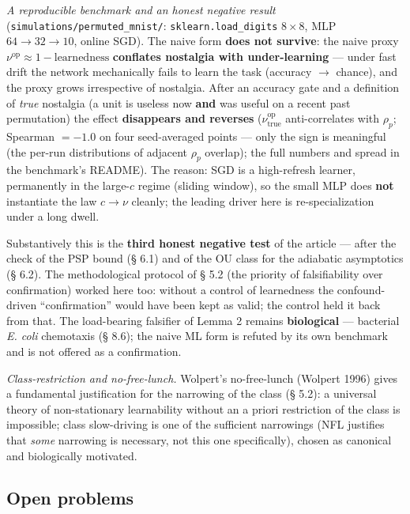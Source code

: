 \documentclass[pdflatex,sn-mathphys-ay]{sn-jnl}
\begin{document}
\emph{A reproducible benchmark and an honest negative result} (\texttt{simulations/permuted\_mnist/}: \texttt{sklearn.load\_digits} \(8\times8\), MLP \(64\to32\to10\), online SGD). The naive form \textbf{does not survive}: the naive proxy \(\nu^{\text{op}} \approx 1 - \text{learnedness}\) \textbf{conflates nostalgia with under-learning} --- under fast drift the network mechanically fails to learn the task (accuracy \(\to\) chance), and the proxy grows irrespective of nostalgia. After an accuracy gate and a definition of \emph{true} nostalgia (a unit is useless now \textbf{and} was useful on a recent past permutation) the effect \textbf{disappears and reverses} (\(\nu^{\text{op}}_{\text{true}}\) anti-correlates with \(\rho_p\); Spearman \(= -1.0\) on four seed-averaged points --- only the sign is meaningful (the per-run distributions of adjacent \(\rho_p\) overlap); the full numbers and spread in the benchmark's README). The reason: SGD is a high-refresh learner, permanently in the large-\(c\) regime (sliding window), so the small MLP does \textbf{not} instantiate the law \(c \to \nu\) cleanly; the leading driver here is re-specialization under a long dwell.



Substantively this is the \textbf{third honest negative test} of the article --- after the check of the PSP bound (§ 6.1) and of the OU class for the adiabatic asymptotics (§ 6.2). The methodological protocol of § 5.2 (the priority of falsifiability over confirmation) worked here too: without a control of learnedness the confound-driven ``confirmation'' would have been kept as valid; the control held it back from that. The load-bearing falsifier of Lemma 2 remains \textbf{biological} --- bacterial \emph{E. coli} chemotaxis (§ 8.6); the naive ML form is refuted by its own benchmark and is not offered as a confirmation.



\emph{Class-restriction and no-free-lunch.} Wolpert's no-free-lunch (Wolpert 1996) gives a fundamental justification for the narrowing of the class (§ 5.2): a universal theory of non-stationary learnability without an a priori restriction of the class is impossible; class slow-driving is one of the sufficient narrowings (NFL justifies that \emph{some} narrowing is necessary, not this one specifically), chosen as canonical and biologically motivated.



\subsection{Open problems}\label{open-problems}
\end{document}
